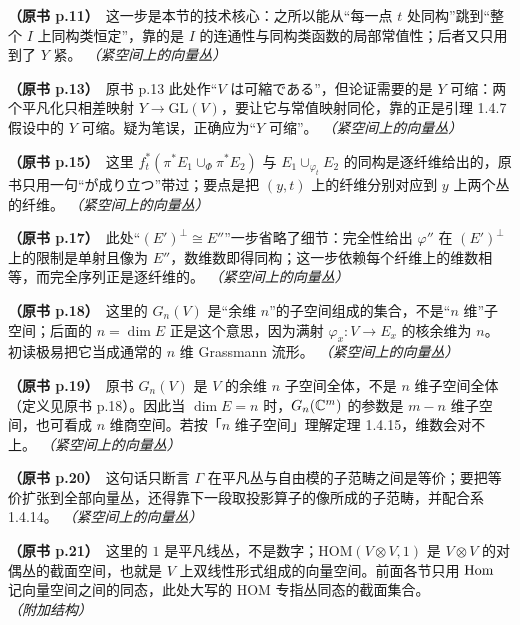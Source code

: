 \noindent \textbf{（原书 p.11）}\ 这一步是本节的技术核心：之所以能从“每一点 $t$ 处同构”跳到“整个 $I$ 上同构类恒定”，靠的是 $I$ 的连通性与同构类函数的局部常值性；后者又只用到了 $Y$ 紧。 \textit{（紧空间上的向量丛）}\par\smallskip

\noindent \textbf{（原书 p.13）}\ 原书 p.13 此处作“$V$ は可縮である”，但论证需要的是 $Y$ 可缩：两个平凡化只相差映射 $Y\to\mathrm{GL}(V)$，要让它与常值映射同伦，靠的正是引理 1.4.7 假设中的 $Y$ 可缩。疑为笔误，正确应为“$Y$ 可缩”。 \textit{（紧空间上的向量丛）}\par\smallskip

\noindent \textbf{（原书 p.15）}\ 这里 $f_t^*(\pi^*E_1\cup_\Phi\pi^*E_2)$ 与 $E_1\cup_{\varphi_t}E_2$ 的同构是逐纤维给出的，原书只用一句“が成り立つ”带过；要点是把 $(y,t)$ 上的纤维分别对应到 $y$ 上两个丛的纤维。 \textit{（紧空间上的向量丛）}\par\smallskip

\noindent \textbf{（原书 p.17）}\ 此处“$(E')^{\perp}\cong E''$”一步省略了细节：完全性给出 $\varphi''$ 在 $(E')^{\perp}$ 上的限制是单射且像为 $E''$，数维数即得同构；这一步依赖每个纤维上的维数相等，而完全序列正是逐纤维的。 \textit{（紧空间上的向量丛）}\par\smallskip

\noindent \textbf{（原书 p.18）}\ 这里的 $G_n(V)$ 是“余维 $n$”的子空间组成的集合，不是“$n$ 维”子空间；后面的 $n=\dim E$ 正是这个意思，因为满射 $\varphi_x\colon V\to E_x$ 的核余维为 $n$。初读极易把它当成通常的 $n$ 维 Grassmann 流形。 \textit{（紧空间上的向量丛）}\par\smallskip

\noindent \textbf{（原书 p.19）}\ 原书 $G_n(V)$ 是 $V$ 的余维 $n$ 子空间全体，不是 $n$ 维子空间全体（定义见原书 p.18）。因此当 $\dim E=n$ 时，$G_n(\mathbb{C}^m)$ 的参数是 $m-n$ 维子空间，也可看成 $n$ 维商空间。若按「$n$ 维子空间」理解定理 1.4.15，维数会对不上。 \textit{（紧空间上的向量丛）}\par\smallskip

\noindent \textbf{（原书 p.20）}\ 这句话只断言 $\Gamma$ 在平凡丛与自由模的子范畴之间是等价；要把等价扩张到全部向量丛，还得靠下一段取投影算子的像所成的子范畴，并配合系 1.4.14。 \textit{（紧空间上的向量丛）}\par\smallskip

\noindent \textbf{（原书 p.21）}\ 这里的 $1$ 是平凡线丛，不是数字；$\mathrm{HOM}(V\otimes V,1)$ 是 $V\otimes V$ 的对偶丛的截面空间，也就是 $V$ 上双线性形式组成的向量空间。前面各节只用 $\operatorname{Hom}$ 记向量空间之间的同态，此处大写的 $\mathrm{HOM}$ 专指丛同态的截面集合。 \textit{（附加结构）}\par\smallskip

